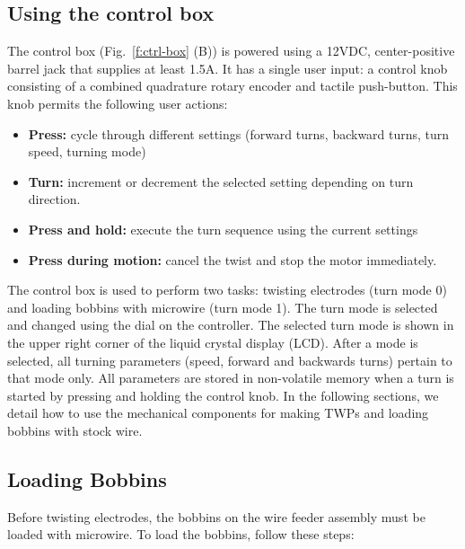 \documentclass[11pt,a4paper]{article}
\begin{document}
\subsection{Using the control box}
The control box (Fig.~\ref{f:ctrl-box} (B)) is powered using a 12VDC,
center-positive barrel jack that supplies at least 1.5A. It has a single user
input: a control knob consisting of a combined quadrature rotary encoder and
tactile push-button. This knob permits the following user actions:

\begin{itemize}[noitemsep]
    \item \textbf{Press:} cycle through different settings (forward turns,
        backward turns, turn speed, turning mode)
    \item \textbf{Turn:} increment or decrement the selected setting
        depending on turn direction.
    \item \textbf{Press and hold:} execute the turn sequence using the
        current settings
    \item \textbf{Press during motion:} cancel the twist and stop the motor
        immediately.
\end{itemize}

The control box is used to perform two tasks: twisting electrodes (turn mode 0)
and loading bobbins with microwire (turn mode 1). The turn mode is selected and
changed using the dial on the controller. The selected turn mode is
shown in the upper right corner of the liquid crystal display (LCD). After a
mode is selected, all turning parameters (speed, forward and backwards turns)
pertain to that mode only. All parameters are stored in non-volatile memory
when a turn is started by pressing and holding the control knob. In the
following sections, we detail how to use the mechanical components for making
TWPs and loading bobbins with stock wire.

\subsection{Loading Bobbins}
Before twisting electrodes, the bobbins on the wire feeder assembly must be
loaded with microwire. To load the bobbins, follow these steps:
\end{document}
